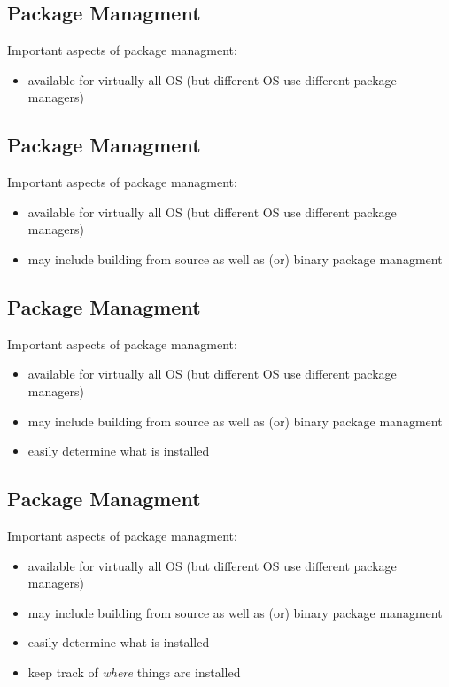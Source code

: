 \documentclass[xga]{xdvislides}
\begin{document}
\subsection{Package Managment}
Important aspects of package managment:
\begin{itemize}
	\item available for virtually all OS (but different OS use
		different package managers)
\end{itemize}


\subsection{Package Managment}
Important aspects of package managment:
\begin{itemize}
	\item available for virtually all OS (but different OS use
		different package managers)
	\item may include building from source as well as (or) binary package
		managment
\end{itemize}

\subsection{Package Managment}
Important aspects of package managment:
\begin{itemize}
	\item available for virtually all OS (but different OS use
		different package managers)
	\item may include building from source as well as (or) binary package
		managment
	\item easily determine what is installed
\end{itemize}

\subsection{Package Managment}
Important aspects of package managment:
\begin{itemize}
	\item available for virtually all OS (but different OS use
		different package managers)
	\item may include building from source as well as (or) binary package
		managment
	\item easily determine what is installed
	\item keep track of {\em where} things are installed
\end{itemize}
\end{document}
